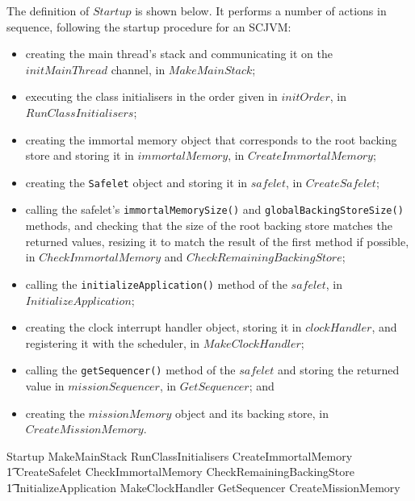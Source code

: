 The definition of $Startup$ is shown below.
It performs a number of actions in sequence, following the startup procedure for an SCJVM:
\begin{itemize}
\item creating the main thread's stack and communicating it on the
  $initMainThread$ channel, in $MakeMainStack$;
\item executing the class initialisers in the order given in
  $initOrder$, in $RunClassInitialisers$;
\item creating the immortal memory object that corresponds to the root
  backing store and storing it in $immortalMemory$, in
  $CreateImmortalMemory$;
\item creating the \texttt{Safelet} object and storing it in
  $safelet$, in $CreateSafelet$;
\item calling the safelet's \texttt{immortalMemorySize()} and
  \texttt{globalBackingStoreSize()} methods, and checking that the
  size of the root backing store matches the returned values, resizing
  it to match the result of the first method if possible, in
  $CheckImmortalMemory$ and $CheckRemainingBackingStore$;
\item calling the \texttt{initializeApplication()} method of the
  $safelet$, in $InitializeApplication$;
\item creating the clock interrupt handler object, storing it in
  $clockHandler$, and registering it with the scheduler, in
  $MakeClockHandler$;
\item calling the \texttt{getSequencer()} method of the $safelet$ and
  storing the returned value in $missionSequencer$, in $GetSequencer$;
  and
\item creating the $missionMemory$ object and its backing store, in
  $CreateMissionMemory$.
\end{itemize}
\begin{circusaction}
  Startup \circdef MakeMainStack \circseq RunClassInitialisers \circseq CreateImmortalMemory \circseq \\
  \t1 CreateSafelet \circseq CheckImmortalMemory \circseq CheckRemainingBackingStore \circseq \\
  \t1 InitializeApplication \circseq MakeClockHandler \circseq GetSequencer \circseq CreateMissionMemory
\end{circusaction}

